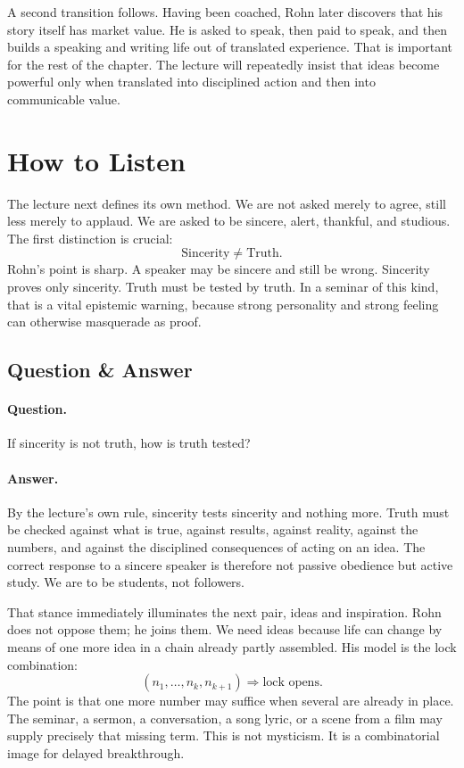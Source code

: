 A second transition follows. Having been coached, Rohn later discovers that his story itself has market value. He is asked to speak, then paid to speak, and then builds a speaking and writing life out of translated experience. That is important for the rest of the chapter. The lecture will repeatedly insist that ideas become powerful only when translated into disciplined action and then into communicable value.

\section{How to Listen}

The lecture next defines its own method. We are not asked merely to agree, still less merely to applaud. We are asked to be sincere, alert, thankful, and studious. The first distinction is crucial:
\begin{equation}
\mathrm{Sincerity} \neq \mathrm{Truth}.
\end{equation}
Rohn's point is sharp. A speaker may be sincere and still be wrong. Sincerity proves only sincerity. Truth must be tested by truth. In a seminar of this kind, that is a vital epistemic warning, because strong personality and strong feeling can otherwise masquerade as proof.

\subsection{Question \& Answer}

\paragraph{Question.} If sincerity is not truth, how is truth tested?

\paragraph{Answer.} By the lecture's own rule, sincerity tests sincerity and nothing more. Truth must be checked against what is true, against results, against reality, against the numbers, and against the disciplined consequences of acting on an idea. The correct response to a sincere speaker is therefore not passive obedience but active study. We are to be students, not followers.

That stance immediately illuminates the next pair, ideas and inspiration. Rohn does not oppose them; he joins them. We need ideas because life can change by means of one more idea in a chain already partly assembled. His model is the lock combination:
\begin{equation}
(n_1,\dots,n_k,n_{k+1}) \Rightarrow \text{lock opens}.
\end{equation}
The point is that one more number may suffice when several are already in place. The seminar, a sermon, a conversation, a song lyric, or a scene from a film may supply precisely that missing term. This is not mysticism. It is a combinatorial image for delayed breakthrough.

